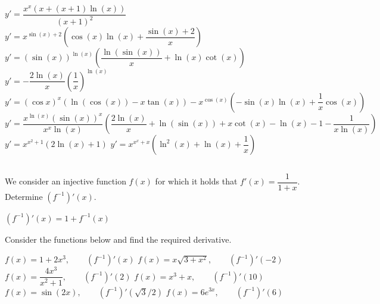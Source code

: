 \begin{Answer}\phantom{}
    
        \Question $ y' = \dfrac{x^x\left( x + (x+1) \ln(x) \right)}{(x+1)^2}$
        \Question $y' = x^{\sin(x) + 2} \left( \cos(x) \ln(x) + \dfrac{\sin(x) + 2}{x} \right) $
		\Question $y' = (\sin (x))^{\ln (x)}\left( \dfrac{\ln (\sin (x)) }{x} + \ln (x) \cot(x)\right)$  
		\Question $y' = -\dfrac{2 \ln (x)}{x}   \left(\dfrac{1}{x}\right)^{\ln (x)}$ 
		\Question $y' = (\cos x)^x ( \ln (\cos (x)) -x \tan (x))- x^{\cos (x)} \left(- \sin (x) \ln (x) + \dfrac{1}{x} \cos (x)  \right)$
		\Question $y' = \dfrac{x^{\ln (x)}(\sin (x))^x}{x^x \ln (x)} \left(\dfrac{2 \ln (x)}{x} + \ln (\sin (x)) + x \cot (x) - \ln (x) - 1 - \dfrac{1}{x \ln (x)}  \right)$ 
		\ifanalysis
		\Question $y'=x^{x^2+1} \left( 2 \ln (x) + 1 \right)$
		\Question $y'=x^{x^x+x} \left(\ln^2 (x) + \ln (x) + \dfrac{1}{x} \right)$
		\fi
	
\end{Answer}
	
	
\subsection*{}
\begin{Exercise}[difficulty = 1] We consider an injective function $f(x)$ for which it holds that $f'(x)=\dfrac{1}{1+x}$. Determine $(f^{-1})'(x)$. 

\end{Exercise}

\begin{Answer}\phantom{}
    $(f^{-1})'(x) = 1 + f^{-1}(x)$
\end{Answer}

\begin{Exercise} Consider the functions below and find the required derivative.
	\begin{multicols}{2}
	\Question[difficulty = 1] $f(x) = 1 + 2x^3, \qquad (f^{-1})'(x)$
	\Question[difficulty = 2] $f(x) = x\sqrt{3 + x^2},  \qquad (f^{-1})'(-2)$
	\ifanalysis\Question[difficulty = 1]\fi\ifcalculus\Question[difficulty = 2]\fi $ f(x) = \dfrac{4x^3}{x^2+1},  \qquad  (f^{-1})'(2)$ 
	\Question[difficulty = 1] $f(x) = x^3+x,  \qquad  (f^{-1})'(10)$ 
	\Question[difficulty = 1] $f(x) = \sin (2x), \qquad (f^{-1})'(\sqrt{3}/2)$ 
	\Question[difficulty = 1] $f(x) = 6e^{3x}, \qquad (f^{-1})'(6)$ 
	\EndCurrentQuestion
	\end{multicols}
	
\end{Exercise}

